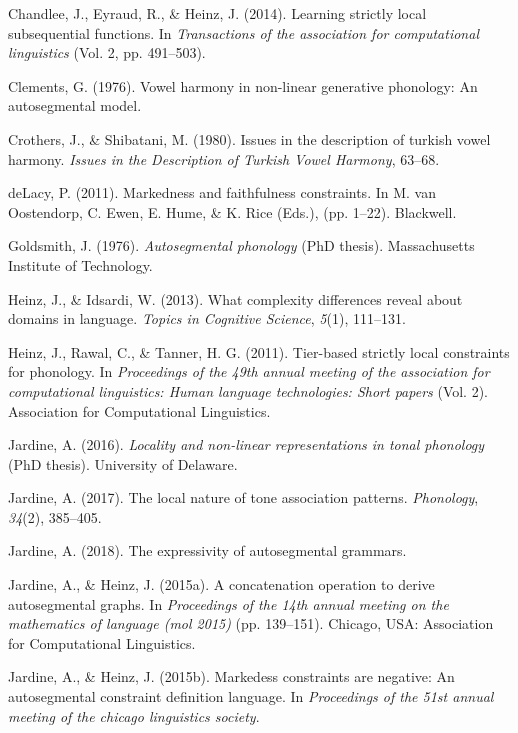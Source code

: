 \documentclass[,doc,floatsintext]{apa6}
\theoremstyle{definition}
\theoremstyle{definition}
\theoremstyle{definition}
\theoremstyle{remark}
\begin{document}
\hypertarget{ref-chandleeeyraudheinz2014}{}
Chandlee, J., Eyraud, R., \& Heinz, J. (2014). Learning strictly local
subsequential functions. In \emph{Transactions of the association for
computational linguistics} (Vol. 2, pp. 491--503).

\hypertarget{ref-Clements1976}{}
Clements, G. (1976). Vowel harmony in non-linear generative phonology:
An autosegmental model.

\hypertarget{ref-crothersshibatani1980}{}
Crothers, J., \& Shibatani, M. (1980). Issues in the description of
turkish vowel harmony. \emph{Issues in the Description of Turkish Vowel
Harmony}, 63--68.

\hypertarget{ref-delacy2011}{}
deLacy, P. (2011). Markedness and faithfulness constraints. In M. van
Oostendorp, C. Ewen, E. Hume, \& K. Rice (Eds.), (pp. 1--22). Blackwell.

\hypertarget{ref-Goldsmith1976}{}
Goldsmith, J. (1976). \emph{Autosegmental phonology} (PhD thesis).
Massachusetts Institute of Technology.

\hypertarget{ref-heinzidsardi2013}{}
Heinz, J., \& Idsardi, W. (2013). What complexity differences reveal
about domains in language. \emph{Topics in Cognitive Science},
\emph{5}(1), 111--131.

\hypertarget{ref-heinzetaltsl}{}
Heinz, J., Rawal, C., \& Tanner, H. G. (2011). Tier-based strictly local
constraints for phonology. In \emph{Proceedings of the 49th annual
meeting of the association for computational linguistics: Human language
technologies: Short papers} (Vol. 2). Association for Computational
Linguistics.

\hypertarget{ref-jardinediss}{}
Jardine, A. (2016). \emph{Locality and non-linear representations in
tonal phonology} (PhD thesis). University of Delaware.

\hypertarget{ref-jardinelocaltone}{}
Jardine, A. (2017). The local nature of tone association patterns.
\emph{Phonology}, \emph{34}(2), 385--405.

\hypertarget{ref-jardineexpressag}{}
Jardine, A. (2018). The expressivity of autosegmental grammars.

\hypertarget{ref-jardineheinz2015}{}
Jardine, A., \& Heinz, J. (2015a). A concatenation operation to derive
autosegmental graphs. In \emph{Proceedings of the 14th annual meeting on
the mathematics of language (mol 2015)} (pp. 139--151). Chicago, USA:
Association for Computational Linguistics.

\hypertarget{ref-jardineheinzcls}{}
Jardine, A., \& Heinz, J. (2015b). Markedess constraints are negative:
An autosegmental constraint definition language. In \emph{Proceedings of
the 51st annual meeting of the chicago linguistics society}.
\end{document}
